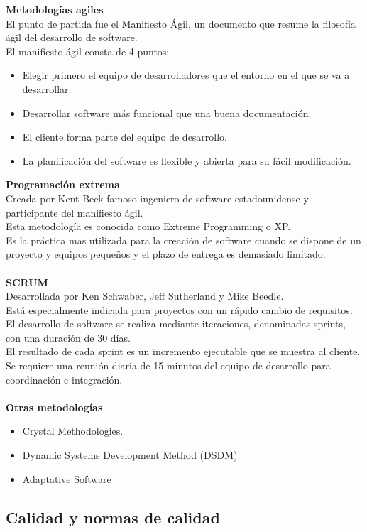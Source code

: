 \documentclass[12pt,twoside]{article}
\begin{document}
\textbf{Metodologías agiles}\\
El punto de partida fue el Manifiesto Ágil, un documento que resume la filosofía ágil 
del desarrollo de software.\\
El manifiesto ágil consta de 4 puntos:
\begin{itemize}
    \item Elegir primero el equipo de desarrolladores que el entorno en el que se va 
    a desarrollar.
    \item Desarrollar software más funcional que una buena documentación.
    \item El cliente forma parte del equipo de desarrollo.
    \item La planificación del software es flexible y abierta para su fácil 
    modificación.
\end{itemize}
\textbf{Programación extrema}\\
Creada por Kent Beck famoso ingeniero de software estadounidense y participante del 
manifiesto ágil.\\
Esta metodología es conocida como Extreme Programming o XP.\\
Es la práctica mas utilizada para la creación de software cuando se dispone de un 
proyecto y equipos pequeños y el plazo de entrega es demasiado limitado.\\ \\
\textbf{SCRUM}\\
Desarrollada por Ken Schwaber, Jeff Sutherland y Mike Beedle.\\
Está especialmente indicada para proyectos con un rápido cambio de requisitos.\\
El desarrollo de software se realiza mediante iteraciones, denominadas sprints, con 
una duración de 30 días.\\
El resultado de cada sprint es un incremento ejecutable que se muestra al cliente.\\
Se requiere una reunión diaria de 15 minutos del equipo de desarrollo para 
coordinación e integración.\\ \\
\textbf{Otras metodologías}
\begin{itemize}
    \item Crystal Methodologies.
    \item Dynamic Systems Development Method (DSDM).
    \item Adaptative Software
\end{itemize}
\subsection{Calidad y normas de calidad}
\end{document}
